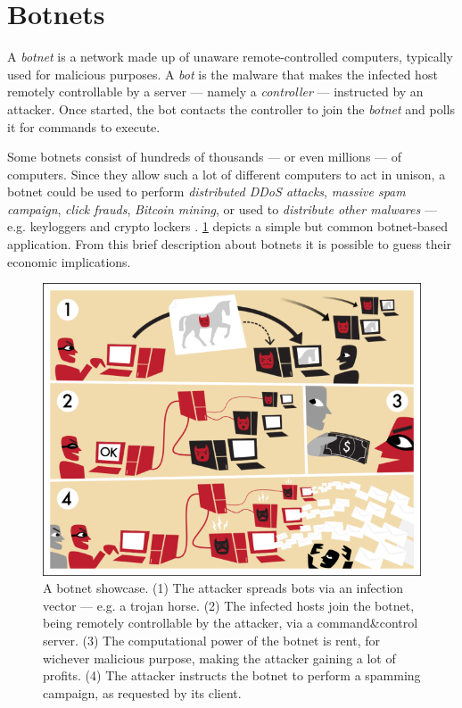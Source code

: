 \section{Botnets}
\label{sec:botnets}

A \textit{botnet} is a network made up of unaware remote-controlled computers, typically used for malicious purposes.
A \textit{bot} is the malware that makes the infected host remotely controllable by a server — namely a \textit{controller} — instructed by an attacker. Once started, the bot contacts the controller to join the \textit{botnet} and polls it for commands to execute.

Some botnets consist of hundreds of thousands — or even millions — of computers. Since they allow such a lot of different computers to act in unison, a botnet could be used to perform \textit{distributed DDoS attacks}, \textit{massive spam campaign}, \textit{click frauds}, \textit{Bitcoin mining}, or used to \textit{distribute other malwares} — e.g. keyloggers and crypto lockers \cite{anderson2008security}. \ref{fig:botnet-showcase} depicts a simple but common botnet-based application. From this brief description about botnets it is possible to guess their economic implications.

\begin{figure}[tp]
  \centering
  \includegraphics[scale=0.6]{./fig/botnetshowcase.png}
  \caption{A botnet showcase. (1) The attacker spreads bots via an infection vector — e.g. a trojan horse. (2) The infected hosts join the botnet, being remotely controllable by the attacker, via a command\&control server. (3) The computational power of the botnet is rent, for wichever malicious purpose, making the attacker gaining a lot of profits. (4) The attacker instructs the botnet to perform a spamming campaign, as requested by its client.}
    \label{fig:botnet-showcase}
\end{figure}

